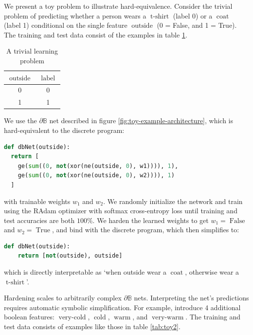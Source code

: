 \documentclass{article} %
\begin{document}
We present a toy problem to illustrate hard-equivalence. Consider the trivial problem of predicting whether a person wears a $\operatorname{t-shirt}$ (label 0) or a $\operatorname{coat}$ (label 1) conditional on the single feature $\operatorname{outside}$ (0 = False, and 1 = True). The training and test data consist of the examples in table \ref{tab:toy1}.

\begin{table}[h!]
	\centering
	\begin{tabular}{|c|c|}
		$\operatorname{outside}$ & $\operatorname{label}$ \\ \hline
		0       & 0     \\
		1       & 1    
	\end{tabular}
	\caption{A trivial learning problem}
	\label{tab:toy1}
\end{table}

We use the $\partial\mathbb{B}$ net described in figure \ref{fig:toy-example-architecture}, which is hard-equivalent to the discrete program:

\begin{lstlisting}[language=Python,style=mystyle,frame=single]
def dbNet(outside):
  return [
    ge(sum((0, not(xor(ne(outside, 0), w1)))), 1),
	ge(sum((0, not(xor(ne(outside, 0), w2)))), 1)
  ]
\end{lstlisting}

with trainable weights $w_{1}$ and $w_{2}$. We randomly initialize the network and train using the RAdam optimizer \citep{Liu2020On} with softmax cross-entropy loss until training and test accuracies are both $100\%$. We harden the learned weights to get $w_{1} = \operatorname{False}$ and $w_{2} = \operatorname{True}$, and bind with the discrete program, which then simplifies to:

\begin{lstlisting}[language=Python,style=mystyle,frame=single]
def dbNet(outside):
	return [not(outside), outside]
\end{lstlisting}

which is directly interpretable as `when outside wear a $\operatorname{coat}$, otherwise wear a $\operatorname{t-shirt}$'.

Hardening scales to arbitrarily complex $\partial\mathbb{B}$ nets. Interpreting the net's predictions requires automatic symbolic simplification. For example, introduce 4 additional boolean features: $\operatorname{very-cold}$, $\operatorname{cold}$, $\operatorname{warm}$, and $\operatorname{very-warm}$. The training and test data consists of examples like those in table \ref{tab:toy2}.
\end{document}
